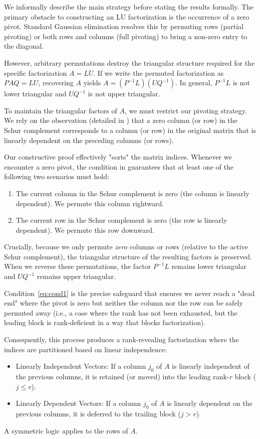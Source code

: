 \documentclass[10pt,twoside]{siamart1116}
\numberwithin{theorem}{section}
\begin{document}
We informally describe the main strategy before stating the results formally. The primary obstacle to constructing an LU factorization is the occurrence of a zero pivot. Standard Gaussian elimination resolves this by permuting rows (partial pivoting) or both rows and columns (full pivoting) to bring a non-zero entry to the diagonal.

However, arbitrary permutations destroy the triangular structure required for the specific factorization $A=LU$. If we write the permuted factorization as $P A Q = L U$, recovering $A$ yields $A = (P^{-1} L) (U Q^{-1})$. In general, $P^{-1} L$ is not lower triangular and $U Q^{-1}$ is not upper triangular.

To maintain the triangular factors of $A$, we must restrict our pivoting strategy. We rely on the observation (detailed in ) that a zero column (or row) in the Schur complement corresponds to a column (or row) in the original matrix that is linearly dependent on the preceding columns (or rows).

Our constructive proof effectively "sorts" the matrix indices. Whenever we encounter a zero pivot, the condition in  guarantees that at least one of the following two scenarios must hold:
\begin{enumerate}
  \item The current column in the Schur complement is zero (the column is linearly dependent). We permute this column rightward.
  \item The current row in the Schur complement is zero (the row is linearly dependent). We permute this row downward.
\end{enumerate}

Crucially, because we only permute \emph{zero} columns or rows (relative to the active Schur complement), the triangular structure of the resulting factors is preserved. When we reverse these permutations, the factor $P^{-1} L$ remains lower triangular and $U Q^{-1}$ remains upper triangular.

Condition~\eqref{eq:cond1} is the precise safeguard that ensures we never reach a "dead end" where the pivot is zero but neither the column nor the row can be safely permuted away (i.e., a case where the rank has not been exhausted, but the leading block is rank-deficient in a way that blocks factorization).

Consequently, this process produces a rank-revealing factorization where the indices are partitioned based on linear independence:
\begin{itemize}
  \item Linearly Independent Vectors: If a column $j_0$ of $A$ is linearly independent of the previous columns, it is retained (or moved) into the leading rank-$r$ block ($j \le r$).
  \item Linearly Dependent Vectors: If a column $j_0$ of $A$ is linearly dependent on the previous columns, it is deferred to the trailing block ($j > r$).
\end{itemize}
A symmetric logic applies to the rows of $A$.
\end{document}
